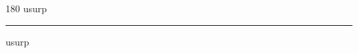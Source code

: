 
\begin{frame}
\begin{center}
\begin{turn}{180}
{\fontsize{2.5cm}{1em}\selectfont usurp}
\end{turn}
\vspace{1em}\par  
\hrule
\vspace{1em}\par  
{\fontsize{2.5cm}{1em}\selectfont usurp}
\end{center}
\end{frame}
